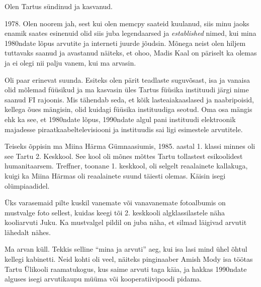 

Olen Tartus sündinud ja kasvanud. 


1978. Olen noorem jah, sest kui olen memcpy saateid kuulanud, siis minu jaoks 
enamik saates esinenuid olid siis juba legendaarsed ja \emph{established} nimed, kui 
mina 1980ndate lõpus arvutite ja interneti juurde jõudsin. Mõnega neist olen hiljem tuttavaks saanud ja avastanud näiteks, 
et ohoo, Madis Kaal on päriselt ka olemas 
ja ei olegi nii palju vanem, kui ma arvasin.


Oli paar erinevat suunda. Esiteks olen pärit teadlaste 
suguvõsast, isa ja vanaisa olid mõlemad füüsikud ja ma kasvasin üles 
Tartus füüsika instituudi järgi nime saanud FI rajoonis. Mis 
tähendab seda, et kõik lasteaiakaaslased ja naabripoisid, kellega õues 
mängisin, olid kuidagi füüsika instituudiga seotud. Oma osa mängis ehk ka see, et 1980ndate lõpus, 1990ndate algul pani instituudi elektroonik majadesse piraatkaabeltelevisiooni ja 
instituudis sai ligi esimestele arvutitele. 

Teiseks õppisin ma Miina Härma Gümnaasiumis, 1985. aastal 1. klassi minnes oli see Tartu 2. 
Keskkool. See kool 
oli mõnes mõttes Tartu tollastest esikoolidest humanitaarsem. 
Treffner, toonane 1. keskkool, oli 
selgelt reaalainete kallakuga, kuigi ka Miina Härmas oli 
reaalainete suund täiesti olemas. Käisin isegi olümpiaadidel. 

Üks varasemaid pilte kuskil vanemate või vanavanemate fotoalbumis 
on mustvalge foto sellest, kuidas keegi tõi 2. keskkooli 
algklassilastele näha kooliarvuti Juku. Ka mustvalgel pildil 
on juba näha, et silmad läigivad arvutit lähedalt nähes.


Ma arvan küll. Tekkis selline \enquote{mina ja arvuti} aeg, kui isa 
lasi mind ühel õhtul kellegi kabinetti. Neid kohti oli veel, 
näiteks pinginaaber Amish Mody isa töötas Tartu Ülikooli raamatukogus, kus saime arvuti taga käia, ja hakkas 1990ndate alguses 
isegi arvutikaupu müüma või kooperatiivipoodi pidama. 

